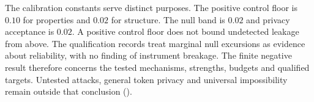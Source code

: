 The calibration constants serve distinct purposes. The positive control
floor is $0.10$ for properties and $0.02$ for structure. The null band
is $0.02$ and privacy acceptance is $0.02$. A positive control floor does
not bound undetected leakage from above. The qualification records treat
marginal null excursions as evidence about reliability, with no finding
of instrument breakage. The finite negative result therefore concerns
the tested mechanisms, strengths, budgets and qualified targets. Untested
attacks, general token privacy and universal impossibility remain outside
that conclusion ().
